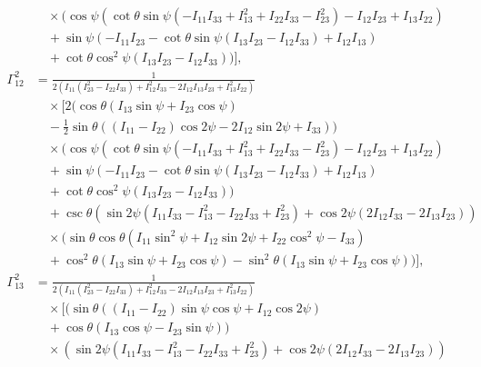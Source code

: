 \documentclass[lineno, pdflatex,sn-mathphys-ay]{sn-jnl}
\theoremstyle{thmstyleone}%
\theoremstyle{thmstyletwo}%
\theoremstyle{thmstylethree}%
\begin{document}
\begin{appendices}
\begin{align}
    &\quad \times \bigg(\cos \psi \left(\cot \theta \sin \psi \left(-I_{11} I_{33}+I_{13}^2+I_{22} I_{33}-I_{23}^2\right)-I_{12} I_{23}+I_{13} I_{22}\right) \nonumber \\
    &\quad +\sin \psi (-I_{11} I_{23}-\cot \theta \sin \psi (I_{13} I_{23}-I_{12} I_{33})+I_{12} I_{13}) \nonumber \\
    &\quad +\cot \theta \cos ^2\psi (I_{13} I_{23}-I_{12} I_{33})\bigg) \bigg], \nonumber \\
    \Gamma^{2}_{12} &= \frac{1}{2 \left(I_{11} \left(I_{23}^2-I_{22} I_{33}\right)+I_{12}^2 I_{33}-2 I_{12} I_{13} I_{23}+I_{13}^2 I_{22}\right)} \nonumber \\
    &\quad \times \bigg[ 2 \bigg(\cos \theta (I_{13} \sin \psi+I_{23} \cos \psi) \nonumber \\
    &\quad -\frac{1}{2} \sin \theta ((I_{11}-I_{22}) \cos 2\psi-2 I_{12} \sin 2\psi+I_{33})\bigg) \nonumber \\
    &\quad \times \bigg(\cos \psi \left(\cot \theta \sin \psi \left(-I_{11} I_{33}+I_{13}^2+I_{22} I_{33}-I_{23}^2\right)-I_{12} I_{23}+I_{13} I_{22}\right) \nonumber \\
    &\quad +\sin \psi (-I_{11} I_{23}-\cot \theta \sin \psi (I_{13} I_{23}-I_{12} I_{33})+I_{12} I_{13}) \nonumber \\
    &\quad +\cot \theta \cos ^2\psi (I_{13} I_{23}-I_{12} I_{33})\bigg) \nonumber \\
    &\quad +\csc \theta \left(\sin 2\psi \left(I_{11} I_{33}-I_{13}^2-I_{22} I_{33}+I_{23}^2\right)+\cos 2\psi (2 I_{12} I_{33}-2 I_{13} I_{23})\right) \nonumber \\
    &\quad \times \bigg(\sin \theta \cos \theta \left(I_{11} \sin ^2\psi+I_{12} \sin 2\psi+I_{22} \cos ^2\psi-I_{33}\right) \nonumber \\
    &\quad +\cos ^2\theta (I_{13} \sin \psi+I_{23} \cos \psi)-\sin ^2\theta (I_{13} \sin \psi+I_{23} \cos \psi)\bigg) \bigg], \nonumber \\
    \Gamma^{2}_{13} &= \frac{1}{2 \left(I_{11} \left(I_{23}^2-I_{22} I_{33}\right)+I_{12}^2 I_{33}-2 I_{12} I_{13} I_{23}+I_{13}^2 I_{22}\right)} \nonumber \\
    &\quad \times \bigg[ (\sin \theta ((I_{11}-I_{22}) \sin \psi \cos \psi+I_{12} \cos 2\psi) \nonumber \\
    &\quad +\cos \theta (I_{13} \cos \psi-I_{23} \sin \psi)) \nonumber \\
    &\quad \times \left(\sin 2\psi \left(I_{11} I_{33}-I_{13}^2-I_{22} I_{33}+I_{23}^2\right)+\cos 2\psi (2 I_{12} I_{33}-2 I_{13} I_{23})\right) \nonumber \\

\end{align}
\end{appendices}
\end{document}
